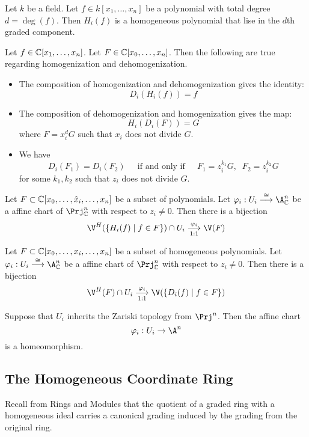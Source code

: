 \documentclass[a4paper]{article}
\begin{document}
\begin{lmm}{}{} Let $k$ be a field. Let $f\in k[x_1,\dots,x_n]$ be a polynomial with total degree $d=\deg(f)$. Then $H_i(f)$ is a homogeneous polynomial that lise in the $d$th graded component. 
\end{lmm}

\begin{prp}{}{} Let $f\in\mathbb{C}[x_1,\dots,x_n]$. Let $F\in\mathbb{C}[x_0,\dots,x_n]$. Then the following are true regarding homogenization and dehomogenization. 
\begin{itemize}
\item The composition of homogenization and dehomogenization gives the identity: $$D_i(H_i(f))=f$$
\item The composition of dehomogenization and homogenization gives the map: $$H_i(D_i(F))=G$$ where $F=x_i^dG$ such that $x_i$ does not divide $G$. 
\item We have $$D_i(F_1)=D_i(F_2)\;\;\;\;\text{ if and only if }\;\;\;\;F_1=z_i^{k_1}G,\;\;F_2=z_i^{k_2}G$$ for some $k_1,k_2$ such that $z_i$ does not divide $G$. 
\end{itemize}
\end{prp}

\begin{crl}{}{} Let $F\subset\mathbb{C}[x_0,\dots,\hat{x}_i,\dots,x_n]$ be a subset of polynomials. Let $\varphi_i:U_i\overset{\cong}{\longrightarrow}\A_\C^n$ be a affine chart of $\Prj_\C^n$ with respect to $z_i\neq 0$. Then there is a bijection $$\V^H(\{H_i(f)\;|\;f\in F\})\cap U_i\underset{1:1}{\overset{\varphi_i}{\longrightarrow}}\V(F)$$
\end{crl}

\begin{crl}{}{} Let $F\subset\mathbb{C}[x_0,\dots,x_i,\dots,x_n]$ be a subset of homogeneous polynomials. Let $\varphi_i:U_i\overset{\cong}{\longrightarrow}\A_\C^n$ be a affine chart of $\Prj_\C^n$ with respect to $z_i\neq 0$. Then there is a bijection $$\V^H(F)\cap U_i\underset{1:1}{\overset{\varphi_i}{\longrightarrow}}\V(\{D_i(f)\;|\;f\in F\})$$
\end{crl}

\begin{crl}{}{} Suppose that $U_i$ inherits the Zariski topology from $\Prj^n$. Then the affine chart $$\varphi_i:U_i\to\A^n$$ is a homeomorphism. 
\end{crl}

\subsection{The Homogeneous Coordinate Ring}
Recall from Rings and Modules that the quotient of a graded ring with a homogeneous ideal carries a canonical grading induced by the grading from the original ring. 
\end{document}
